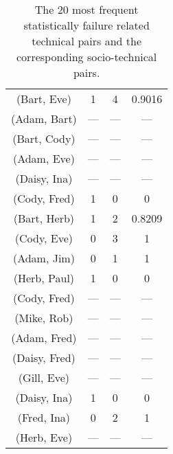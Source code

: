 \begin{table*}[t]
{\begin{tabular}{@{\hspace{.2cm}}ccc@{\hspace{.75cm}}c@{\hspace{.2cm}}}
(Bart, Eve)	&	1&	4&	0.9016\\
(Adam, Bart)	&	---&	---&	---\\
(Bart, Cody)	&	---&	---&	---\\
(Adam, Eve)	&	---&	---&	---\\
(Daisy, Ina)	&	---&	---&	---\\
(Cody, Fred)	&	1&	0&	0\\
(Bart, Herb)	&	1&	2&	0.8209\\
(Cody, Eve)	&	0&	3&	1\\
(Adam, Jim)	&	0&	1&	1\\
(Herb, Paul)	&	1&	0&	0\\
(Cody, Fred)	&	---&	---&	---\\
(Mike, Rob)	&	---&	---&	---\\
(Adam, Fred)	&	---&	---&	---\\
(Daisy, Fred)	&	---&	---&	---\\
(Gill, Eve)		&	---&	---&	---\\
(Daisy, Ina)	&	1&	0&	0\\
(Fred, Ina)	&	0&	2&	1\\
(Herb, Eve)	&	---&	---&	---\\
\bottomrule
\end{tabular}
\label{tab:stechpairs}
}
\caption{The 20 most frequent statistically failure related technical pairs and the corresponding socio-technical pairs.}
\label{tab:pairs}
\end{table*}
\addtocounter{table}{-1}